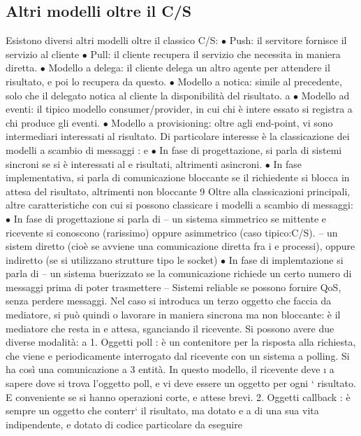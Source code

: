 \subsection{Altri modelli oltre il C/S}
Esistono diversi altri modelli oltre il classico C/S:
$\bullet$ Push: il servitore fornisce il servizio al cliente
$\bullet$ Pull: il cliente recupera il servizio che necessita in maniera diretta.
$\bullet$ Modello a delega: il cliente delega un altro agente per attendere il risultato,
e poi lo recupera da questo.
$\bullet$ Modello a notica: simile al precedente, solo che il delegato notica al
cliente la disponibilità del risultato.
a
$\bullet$ Modello ad eventi: il tipico modello consumer/provider, in cui chi è intere
essato si registra a chi produce gli eventi.
$\bullet$ Modello a provisioning: oltre agli end-point, vi sono intermediari interessati al risultato.
Di particolare interesse è la classicazione dei modelli a scambio di messaggi :
e
$\bullet$ In fase di progettazione, si parla di sistemi sincroni se si è interessati al
e
risultati, altrimenti asincroni.
$\bullet$ In fase implementativa, si parla di comunicazione bloccante se il richiedente
si blocca in attesa del risultato, altrimenti non bloccante
9
Oltre alla classicazioni principali, altre caratteristiche con cui si possono classicare i modelli a scambio di
messaggi:
$\bullet$ In fase di progettazione si parla di
-- un sistema simmetrico se mittente e ricevente si conoscono (rarissimo) oppure asimmetrico (caso tipico:C/S).
-- un sistem diretto (cioè se avviene una comunicazione diretta fra i
e
processi), oppure indiretto (se si utilizzano strutture tipo le socket)
$\bullet$ In fase di implemtazione si parla di
-- un sistema buerizzato se la comunicazione richiede un certo numero
di messaggi prima di poter trasmettere
-- Sistemi reliable se possono fornire QoS, senza perdere messaggi.
Nel caso si introduca un terzo oggetto che faccia da mediatore, si può quindi
o
lavorare in maniera sincrona ma non bloccante: è il mediatore che resta in
e
attesa, sganciando il ricevente. Si possono avere due diverse modalità:
a
1. Oggetti poll : è un contenitore per la risposta alla richiesta, che viene
e
periodicamente interrogato dal ricevente con un sistema a polling. Si ha
così una comunicazione a 3 entità. In questo modello, il ricevente deve
\i{}
a
sapere dove si trova l'oggetto poll, e vi deve essere un oggetto per ogni
`
risultato. E conveniente se si hanno operazioni corte, e attese brevi.
2. Oggetti callback : è sempre un oggetto che conterr` il risultato, ma dotato
e
a
di una sua vita indipendente, e dotato di codice particolare da eseguire
